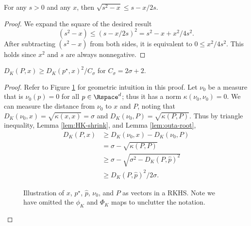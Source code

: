 \documentclass[11pt]{myclass}
\begin{document}
\begin{lemma}
\label{lem:outa-root}
For any $s>0$ and any $x$, then $\sqrt{s^2 - x} \leq s-x/2s$.
\end{lemma}
\begin{proof}
We expand the square of the desired result
\[
(s^2 -x) \leq (s-x/2s)^2 = s^2 -x +x^2/4s^2.
\]
After subtracting $(s^2-x)$ from both sides, it is equivalent to $0 \leq x^2/4s^2$.  This holds since $x^2$ and $s$ are always nonnegative.  
\end{proof}


\begin{lemma}
\label{lem:sq-bnd}
$D_K(P,x) \geq D_K(p^\star, x)^2/C_\sigma$ for $C_\sigma = 2\sigma + 2$. 
\end{lemma}
\begin{proof}
Refer to Figure \ref{fig:kern-pow} for geometric intuition in this proof.  
Let $\nu_0$ be a measure that is $\nu_0(p) = 0$ for all $p \in \Rspace^d$; thus it has a norm $\kappa(\nu_0, \nu_0) = 0$.  
We can measure the distance from $\nu_0$ to $x$ and $P$, noting that $D_K(\nu_0,x) = \sqrt{\kappa(x,x)} = \sigma$ and $D_K(\nu_0, P) = \sqrt{\kappa(P,P)}$.  Thus by triangle inequality, Lemma \ref{lem:HK-shrink}, and Lemma \ref{lem:outa-root},   
\begin{align*}
D_K(P,x) 
& \geq 
D_K(\nu_0, x) - D_K(\nu_0,P) 
\\ &= 
\sigma - \sqrt{\kappa(P,P)}
\\ &\geq
\sigma - \sqrt{\sigma^2 - D_K(P,\hat p)^2}  
\\ & \geq
D_K(P,\hat p)^2/2\sigma.  
\end{align*}



\begin{figure}
\vspace{-5mm}
\caption{\label{fig:kern-pow}
\small \sffamily 
Illustration of $x$, $p^\star$, $\hat p$, $\nu_0$, and $P$ as vectors in a RKHS.  Note we have omitted the $\phi_K$ and $\Phi_K$ maps to unclutter the notation.  
}
\end{figure}


\end{proof}
\end{document}
